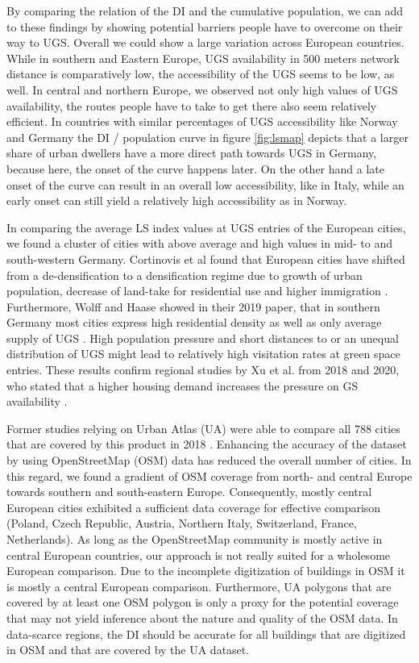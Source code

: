 \documentclass[10pt]{article}
\begin{document}
By comparing the relation of the DI and the cumulative population, we can add to these findings by showing potential barriers people have to overcome on their way to UGS.
Overall we could show a large variation across European countries.
While in southern and Eastern Europe, UGS availability in 500 meters network distance is comparatively low, the accessibility of the UGS seems to be low, as well.
In central and northern Europe, we observed not only high values of UGS availability, the routes people have to take to get there also seem relatively efficient. 
In countries with similar percentages of UGS accessibility like Norway and Germany the DI / population curve in figure \ref{fig:lsmap} depicts that a larger share of urban dwellers have a more direct path towards UGS in Germany, because here, the onset of the curve happens later.
On the other hand a late onset of the curve can result in an overall low accessibility, like in Italy,  while an early onset can still yield a relatively high accessibility as in Norway. 

In comparing the average LS index values at UGS entries of the European cities, we found a cluster of cities with above average and high values in mid- to and south-western Germany.
Cortinovis et al found that European cities have shifted from a de-densification to a densification regime due to growth of urban population, decrease of land-take for residential use and higher immigration \citep{Cortinovis.2022}.
Furthermore, Wolff and Haase showed in their 2019 paper, that in southern Germany most cities express high residential density as well as only average supply of UGS \citep{Wolff.2019}.
High population pressure and short distances to or an unequal distribution of UGS might lead to relatively high visitation rates at green space entries.
These results confirm regional studies by Xu et al. from 2018 and 2020, who stated that a higher housing demand increases the pressure on GS availability \citep{Xu.2018, Xu.2020}.

Former studies relying on Urban Atlas (UA) were able to compare all 788 cities that are covered by this product in 2018 \citep{EuropeanUnion.2020}.
Enhancing the accuracy of the dataset by using OpenStreetMap (OSM) data has reduced the overall number of cities.
In this regard, we found a gradient of OSM coverage from north- and central Europe towards southern and south-eastern Europe.
Consequently, mostly central European cities exhibited a sufficient data coverage for effective comparison (Poland, Czech Republic, Austria, Northern Italy, Switzerland, France, Netherlands).
As long as the OpenStreetMap community is mostly active in central European countries, our approach is not really suited for a wholesome European comparison.
Due to the incomplete digitization of buildings in OSM it is mostly a central European comparison.
Furthermore, UA polygons that are covered by at least one OSM polygon is only a proxy for the potential coverage that may not yield inference about the nature and quality of the OSM data.
In data-scarce regions, the DI should be accurate for all buildings that are digitized in OSM and that are covered by the UA dataset.
\end{document}
